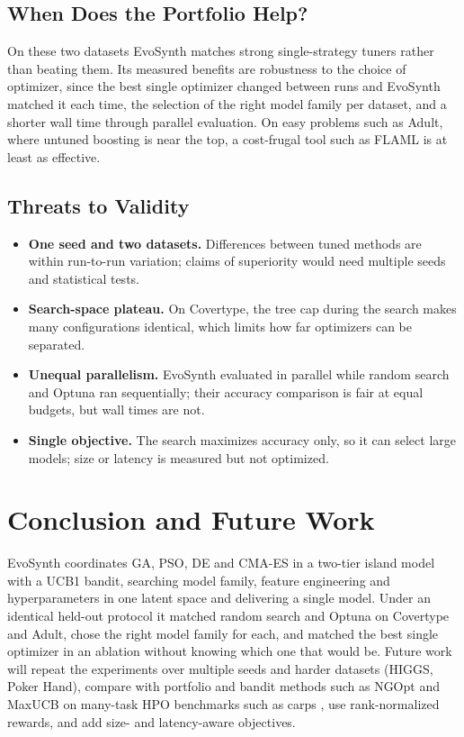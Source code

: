 \documentclass[conference]{IEEEtran}
\begin{document}
\subsection{When Does the Portfolio Help?}
On these two datasets EvoSynth matches strong single-strategy tuners rather than beating them. Its measured benefits are robustness to the choice of optimizer, since the best single optimizer changed between runs and EvoSynth matched it each time, the selection of the right model family per dataset, and a shorter wall time through parallel evaluation. On easy problems such as Adult, where untuned boosting is near the top, a cost-frugal tool such as FLAML is at least as effective.

\subsection{Threats to Validity}
\begin{itemize}
    \item \textbf{One seed and two datasets.} Differences between tuned methods are within run-to-run variation; claims of superiority would need multiple seeds and statistical tests.
    \item \textbf{Search-space plateau.} On Covertype, the tree cap during the search makes many configurations identical, which limits how far optimizers can be separated.
    \item \textbf{Unequal parallelism.} EvoSynth evaluated in parallel while random search and Optuna ran sequentially; their accuracy comparison is fair at equal budgets, but wall times are not.
    \item \textbf{Single objective.} The search maximizes accuracy only, so it can select large models; size or latency is measured but not optimized.
\end{itemize}

\section{Conclusion and Future Work}\label{sec:conclusion}
EvoSynth coordinates GA, PSO, DE and CMA-ES in a two-tier island model with a UCB1 bandit, searching model family, feature engineering and hyperparameters in one latent space and delivering a single model. Under an identical held-out protocol it matched random search and Optuna on Covertype and Adult, chose the right model family for each, and matched the best single optimizer in an ablation without knowing which one that would be. Future work will repeat the experiments over multiple seeds and harder datasets (HIGGS, Poker Hand), compare with portfolio and bandit methods such as NGOpt \cite{meunier2022blackbox} and MaxUCB \cite{balef2025cash} on many-task HPO benchmarks such as carps \cite{benjamins2025carps}, use rank-normalized rewards, and add size- and latency-aware objectives.
\end{document}

